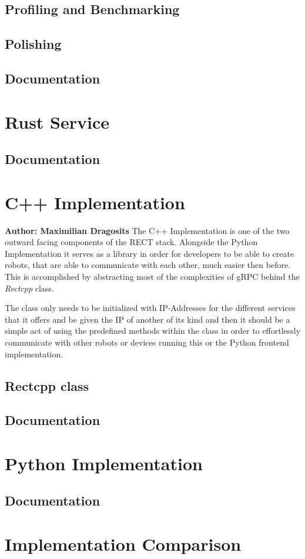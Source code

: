 \subsection{Profiling and Benchmarking}

\subsection{Polishing}

\subsection{Documentation}

\section{Rust Service}
\subsection{Documentation}

\section{C++ Implementation}
\textbf{Author: Maximilian Dragosits}
The C++ Implementation is one of the two outward facing components of the RECT stack. Alongside the Python Implementation 
it serves as a library in order for developers to be able to create robots, that are able to communicate with each other, much
easier then before. This is accomplished by abstracting most of the complexities of gRPC behind the \textit{Rectcpp} class. 

The class only needs to be initialized with IP-Addresses for the different services that it offers and be given the IP of 
another of its kind and then it should be a simple act of using the predefined methods within the class in order to 
effortlessly communicate with other robots or devices running this or the Python frontend implementation.

\subsection{Rectcpp class}
\subsection{Documentation}

\section{Python Implementation}

\subsection{Documentation}

\section{Implementation Comparison}

\filbreak
